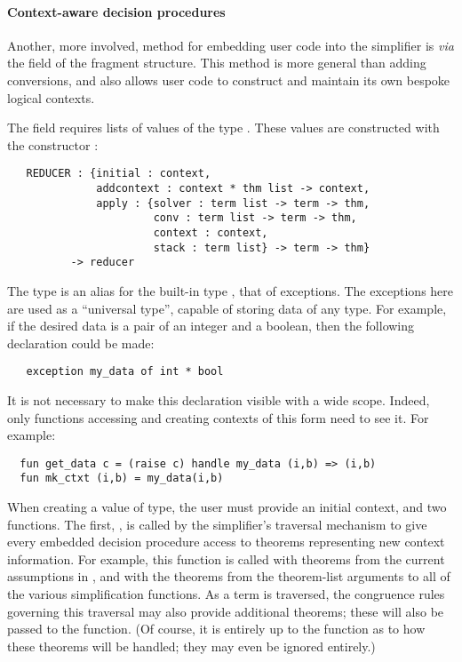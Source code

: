 \paragraph{Context-aware decision procedures}
Another, more involved, method for embedding user code into the
simplifier is \emph{via} the  field of the \simpset{}
fragment structure.  This method is more general than adding
conversions, and also allows user code to construct and maintain its
own bespoke logical contexts.

The  field requires lists of values of the type
.  These values are constructed with the
constructor :
\begin{hol}
\begin{verbatim}
   REDUCER : {initial : context,
              addcontext : context * thm list -> context,
              apply : {solver : term list -> term -> thm,
                       conv : term list -> term -> thm,
                       context : context,
                       stack : term list} -> term -> thm}
          -> reducer
\end{verbatim}
\end{hol}
The  type is an alias for the built-in \ML{} type
, that of exceptions.  The exceptions here are used as a
``universal type'', capable of storing data of any type.  For example,
if the desired data is a pair of an integer and a boolean, then the
following declaration could be made:
\begin{hol}
\begin{verbatim}
   exception my_data of int * bool
\end{verbatim}
\end{hol}
It is not necessary to make this declaration visible with a wide
scope.  Indeed, only functions accessing and creating contexts of this
form need to see it. For example:
\begin{hol}
\begin{verbatim}
  fun get_data c = (raise c) handle my_data (i,b) => (i,b)
  fun mk_ctxt (i,b) = my_data(i,b)
\end{verbatim}
\end{hol}

When creating a value of  type, the user must provide an
initial context, and two functions.  The first, , is
called by the simplifier's traversal mechanism to give every embedded
decision procedure access to theorems representing new context
information.  For example, this function is called with theorems from
the current assumptions in , and with the theorems
from the theorem-list arguments to all of the various simplification
functions.  As a term is traversed, the congruence rules governing
this traversal may also provide additional theorems; these will also
be passed to the  function.  (Of course, it is entirely
up to the  function as to how these theorems will be
handled; they may even be ignored entirely.)

